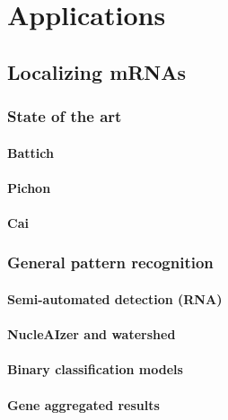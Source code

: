
\graphicspath{{../../figures/chapter_5/}}

\part{Applications}
\chapter{Localizing \ac{mRNA}s} \label{chap:chapter_5}
\minitoc
\newpage


\section{State of the art}


\subsection{Battich}

\subsection{Pichon}

\subsection{Cai}


\section{General pattern recognition}


\subsection{Semi-automated detection (\ac{RNA})}

\subsection{NucleAIzer and watershed}

\subsection{Binary classification models}

\subsection{Gene aggregated results}

